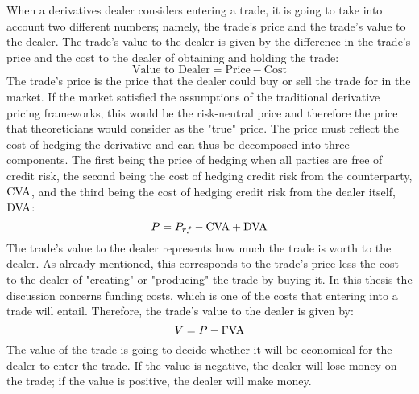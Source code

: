 \documentclass[main.tex]{subfiles}
\begin{document}
    When a derivatives dealer considers entering a trade, 
    it is going to take into account two different numbers; 
    namely, the trade's price and the trade's value to the dealer.
    The trade's value to the dealer is given by the difference in the trade's price
    and the cost to the dealer of obtaining and holding the trade:
        \begin{equation}
            \text{Value to Dealer} 
            =
            \text{Price}
            -
            \text{Cost}
        \end{equation}
    The trade's price is the price that the dealer could buy or sell the trade for in the market.
    If the market satisfied the assumptions of the traditional derivative pricing frameworks,
    this would be the risk-neutral price and therefore the price that 
    theoreticians would consider as the "true" price.
    The price must reflect the cost of hedging the derivative
    and can thus be decomposed into three components. 
    The first being the price of hedging when all parties are free of credit risk, 
    the second being the cost of hedging credit risk from the counterparty, $\CVA/$,
    and the third being the cost of hedging credit risk from the dealer itself, $\DVA/$:
        \begin{equation}
            P = 
            P_{rf} 
            -
            \CVA/
            +
            \DVA/
        \end{equation}
    The trade's value to the dealer represents how much the trade is worth to the dealer.
    As already mentioned, this corresponds to the trade's price less the cost to the dealer
    of "creating" or "producing" the trade by buying it.
    In this thesis the discussion concerns funding costs,
    which is one of the costs that entering into a trade will entail.
    Therefore, the trade's value to the dealer is given by:
        \begin{equation}
            V = P - \FVA/
        \end{equation}
    The value of the trade is going to decide whether it will be economical 
    for the dealer to enter the trade. 
    If the value is negative, the dealer will lose money on the trade;
    if the value is positive, the dealer will make money.
    
\end{document}
